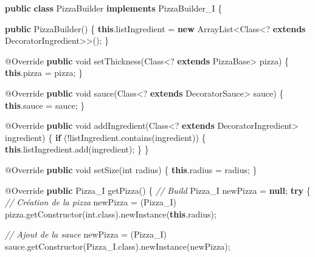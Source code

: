 \documentclass[french,]{article}
\newenvironment{Shaded}{}{}
\newcommand{\KeywordTok}[1]{\textcolor[rgb]{0.00,0.44,0.13}{\textbf{{#1}}}}
\newcommand{\DataTypeTok}[1]{\textcolor[rgb]{0.56,0.13,0.00}{{#1}}}
\newcommand{\CommentTok}[1]{\textcolor[rgb]{0.38,0.63,0.69}{\textit{{#1}}}}
\newcommand{\FunctionTok}[1]{\textcolor[rgb]{0.02,0.16,0.49}{{#1}}}
\newcommand{\NormalTok}[1]{{#1}}
\begin{document}
\begin{Shaded}
\begin{Highlighting}[]
\KeywordTok{public} \KeywordTok{class} \NormalTok{PizzaBuilder }\KeywordTok{implements} \NormalTok{PizzaBuilder_I \{}

    \KeywordTok{public} \FunctionTok{PizzaBuilder}\NormalTok{() \{}
        \KeywordTok{this}\NormalTok{.}\FunctionTok{listIngredient} \NormalTok{= }\KeywordTok{new} \NormalTok{ArrayList<Class<? }\KeywordTok{extends} \NormalTok{DecoratorIngredient>>();}
    \NormalTok{\}}

    \FunctionTok{@Override}
    \KeywordTok{public} \DataTypeTok{void} \FunctionTok{setThickness}\NormalTok{(Class<? }\KeywordTok{extends} \NormalTok{PizzaBase> pizza) \{}
        \KeywordTok{this}\NormalTok{.}\FunctionTok{pizza} \NormalTok{= pizza;}
    \NormalTok{\}}

    \FunctionTok{@Override}
    \KeywordTok{public} \DataTypeTok{void} \FunctionTok{sauce}\NormalTok{(Class<? }\KeywordTok{extends} \NormalTok{DecoratorSauce> sauce) \{}
        \KeywordTok{this}\NormalTok{.}\FunctionTok{sauce} \NormalTok{= sauce;}
    \NormalTok{\}}

    \FunctionTok{@Override}
    \KeywordTok{public} \DataTypeTok{void} \FunctionTok{addIngredient}\NormalTok{(Class<? }\KeywordTok{extends} \NormalTok{DecoratorIngredient> ingredient) \{}
        \KeywordTok{if} \NormalTok{(!listIngredient.}\FunctionTok{contains}\NormalTok{(ingredient)) \{}
            \KeywordTok{this}\NormalTok{.}\FunctionTok{listIngredient}\NormalTok{.}\FunctionTok{add}\NormalTok{(ingredient);}
        \NormalTok{\}}
    \NormalTok{\}}

    \FunctionTok{@Override}
    \KeywordTok{public} \DataTypeTok{void} \FunctionTok{setSize}\NormalTok{(}\DataTypeTok{int} \NormalTok{radius) \{}
        \KeywordTok{this}\NormalTok{.}\FunctionTok{radius} \NormalTok{= radius;}
    \NormalTok{\}}

    \FunctionTok{@Override}
    \KeywordTok{public} \NormalTok{Pizza_I }\FunctionTok{getPizza}\NormalTok{() \{}
        \CommentTok{// Build}
        \NormalTok{Pizza_I newPizza = }\KeywordTok{null}\NormalTok{;}
        \KeywordTok{try} \NormalTok{\{}
            \CommentTok{// Création de la pizza}
            \NormalTok{newPizza = (Pizza_I) pizza.}\FunctionTok{getConstructor}\NormalTok{(}\DataTypeTok{int}\NormalTok{.}\FunctionTok{class}\NormalTok{).}\FunctionTok{newInstance}\NormalTok{(}\KeywordTok{this}\NormalTok{.}\FunctionTok{radius}\NormalTok{);}

            \CommentTok{// Ajout de la sauce}
            \NormalTok{newPizza = (Pizza_I) sauce.}\FunctionTok{getConstructor}\NormalTok{(Pizza_I.}\FunctionTok{class}\NormalTok{).}\FunctionTok{newInstance}\NormalTok{(newPizza);}


\end{Highlighting}
\end{Shaded}
\end{document}
